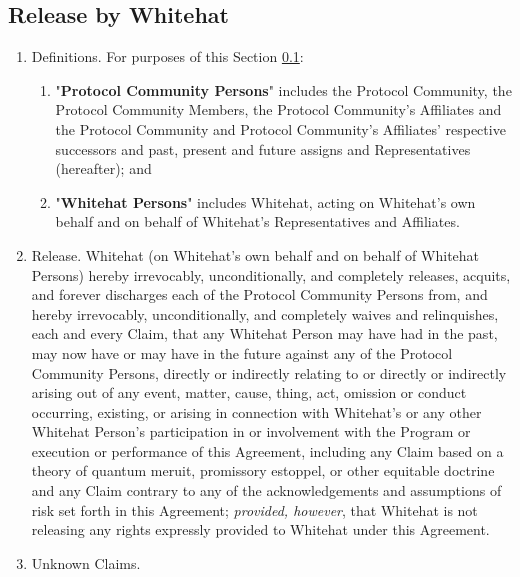 \documentclass{article}
\begin{document}
\subsection{Release by Whitehat}\label{subsec:release_by_whitehat}

\begin{enumerate}

    \item Definitions. For purposes of this Section \ref{subsec:release_by_whitehat}:

          \begin{enumerate}
              \item "\textbf{Protocol Community Persons}" includes the Protocol Community, the Protocol Community Members, the Protocol Community's Affiliates and the Protocol Community and Protocol Community's Affiliates' respective successors and past, present and future assigns and Representatives (hereafter); and

              \item "\textbf{Whitehat Persons}" includes Whitehat, acting on Whitehat's own behalf and on behalf of Whitehat's Representatives and Affiliates.

          \end{enumerate}

    \item Release. Whitehat (on Whitehat's own behalf and on behalf of Whitehat Persons) hereby irrevocably, unconditionally, and completely releases, acquits, and forever discharges each of the Protocol Community Persons from, and hereby irrevocably, unconditionally, and completely waives and relinquishes, each and every Claim, that any Whitehat Person may have had in the past, may now have or may have in the future against any of the Protocol Community Persons, directly or indirectly relating to or directly or indirectly arising out of any event, matter, cause, thing, act, omission or conduct occurring, existing, or arising in connection with Whitehat's or any other Whitehat Person's participation in or involvement with the Program or execution or performance of this Agreement, including any Claim based on a theory of quantum meruit, promissory estoppel, or other equitable doctrine and any Claim contrary to any of the acknowledgements and assumptions of risk set forth in this Agreement; \textit{provided, however}, that Whitehat is not releasing any rights expressly provided to Whitehat under this Agreement.

    \item Unknown Claims.


\end{enumerate}
\end{document}
